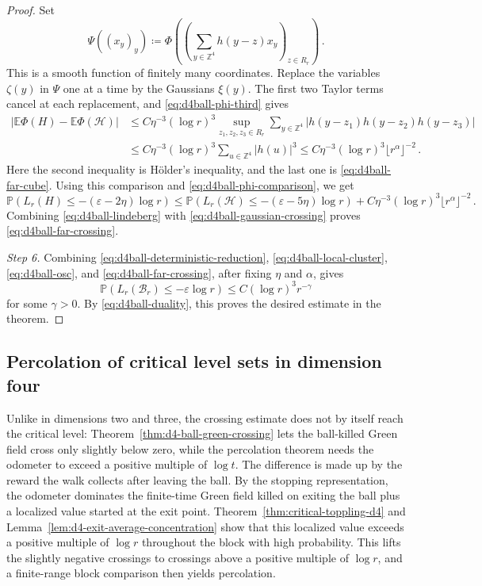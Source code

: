\documentclass[11pt]{amsart}
\theoremstyle{plain}
\theoremstyle{definition}
\newcommand{\Z}{\mathbb{Z}}
\newcommand{\E}{\mathbb{E}}
\renewcommand{\P}{\mathbb{P}}
\begin{document}
\begin{proof}
Set
\[
	\Psi((x_y)_y)\coloneqq
	\Phi\left(\left(\sum_{y\in\Z^4} h(y-z)x_y\right)_{z\in R_r}\right)\, .
\]
This is a smooth function of finitely many coordinates. Replace the variables
$\zeta(y)$ in $\Psi$ one at a time by the Gaussians $\xi(y)$. The first two
Taylor terms cancel at each replacement, and \eqref{eq:d4ball-phi-third} gives
\[
\begin{aligned}
	\left|\E\Phi(H)-\E\Phi(\mathcal H)\right|
	&\leq
	C\eta^{-3}(\log r)^3
	\sup_{z_1,z_2,z_3\in R_r}
	\sum_{y\in\Z^4}
	|h(y-z_1)h(y-z_2)h(y-z_3)|  \\
	&\leq
	C\eta^{-3}(\log r)^3\sum_{u\in\Z^4}|h(u)|^3
	\leq
	C\eta^{-3}(\log r)^3\lfloor r^\alpha\rfloor^{-2}\, .
\end{aligned}
\]
Here the second inequality is H\"older's inequality, and the last one is
\eqref{eq:d4ball-far-cube}. Using this comparison and
\eqref{eq:d4ball-phi-comparison}, we get
\begin{equation}\label{eq:d4ball-lindeberg}
    \P\left(L_r(H)\leq-(\varepsilon-2\eta)\log r\right)
    \leq
    \P\left(L_r(\mathcal H)\leq-(\varepsilon-5\eta)\log r\right)
    +
    C\eta^{-3}(\log r)^3\lfloor r^\alpha\rfloor^{-2}\, .
\end{equation}
Combining \eqref{eq:d4ball-lindeberg} with
\eqref{eq:d4ball-gaussian-crossing} proves
\eqref{eq:d4ball-far-crossing}.

\smallskip
\noindent\emph{Step 6.} Combining \eqref{eq:d4ball-deterministic-reduction},
\eqref{eq:d4ball-local-cluster}, \eqref{eq:d4ball-osc}, and \eqref{eq:d4ball-far-crossing}, after fixing $\eta$ and $\alpha$, gives
\[
    \P\left(L_r(\mathcal B_r)\leq-\varepsilon\log r\right)
    \leq C(\log r)^3r^{-\gamma}
\]
for some $\gamma>0$. By \eqref{eq:d4ball-duality}, this proves the desired estimate in the theorem.  
\end{proof}

\subsection{Percolation of critical level sets in dimension four}

Unlike in dimensions two and three, the crossing estimate does not by itself
reach the critical level: Theorem~\ref{thm:d4-ball-green-crossing} lets the ball-killed Green field cross only slightly below zero, while the percolation theorem needs the odometer to exceed a positive multiple of $\log t$. The difference is made up by the reward the walk collects after leaving the ball. By the stopping representation, the odometer dominates the finite-time Green field killed on exiting the ball plus a localized value started at the exit point. Theorem~\ref{thm:critical-toppling-d4} and Lemma~\ref{lem:d4-exit-average-concentration} show that this localized value exceeds a positive multiple of $\log r$ throughout the block with high probability. This lifts the slightly negative crossings to crossings above a positive multiple of
$\log r$, and a finite-range block comparison then yields percolation.
\end{document}
